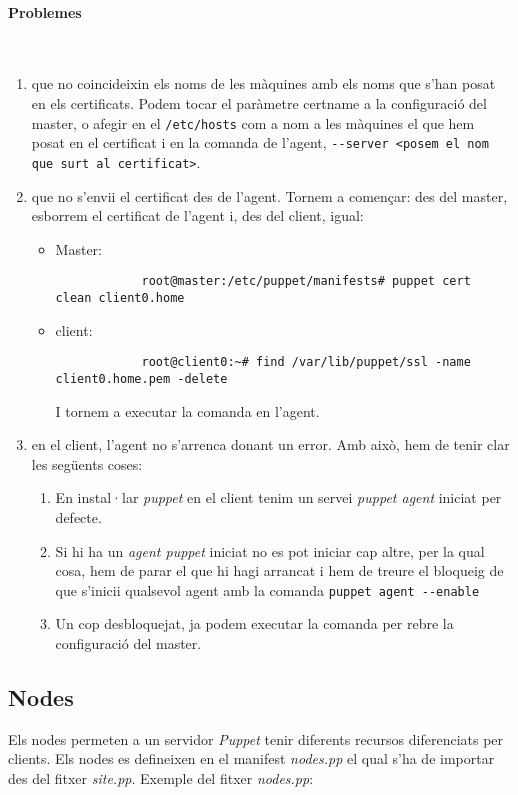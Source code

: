 \documentclass[a4paper]{article}
\begin{document}
\paragraph{Problemes}\\
\begin{enumerate}
	\item que no coincideixin els noms de les màquines amb els noms que s'han posat en els certificats. Podem tocar el paràmetre certname a la configuració del master, o afegir en el \verb+/etc/hosts+ com a nom a les màquines el que hem posat en el certificat i en la comanda de l'agent, \verb+--server <posem el nom que surt al certificat>+.
	\item que no s'envii el certificat des de l'agent. Tornem a començar: des del master, esborrem el certificat de l'agent i, des del client, igual:
	\begin{itemize}
		\item Master:
			\begin{verbatim}
			root@master:/etc/puppet/manifests# puppet cert clean client0.home
			\end{verbatim}
		\item client:
			\begin{verbatim}
			root@client0:~# find /var/lib/puppet/ssl -name client0.home.pem -delete
			\end{verbatim}
			I tornem a executar la comanda en l'agent.
	\end{itemize}
	\item en el client, l'agent no s'arrenca donant un error. Amb això, hem de tenir clar les següents coses:
		\begin{enumerate}
			\item En instal·lar \textit{puppet} en el client tenim un servei \textit{puppet agent} iniciat per defecte.
			\item Si hi ha un \textit{agent puppet} iniciat no es pot iniciar cap altre, per la qual cosa, hem de parar el que hi hagi arrancat i hem de treure el bloqueig de que s'inicii qualsevol agent amb la comanda \verb+puppet agent --enable+
			\item Un cop desbloquejat, ja podem executar la comanda per rebre la configuració del master.
		\end{enumerate}
\end{enumerate}

\subsection{Nodes}
Els nodes permeten a un servidor \textit{Puppet} tenir diferents recursos diferenciats per clients. Els nodes es defineixen en el manifest \textit{nodes.pp} el qual s'ha de importar des del fitxer \textit{site.pp}. Exemple del fitxer \textit{nodes.pp}:
\end{document}
